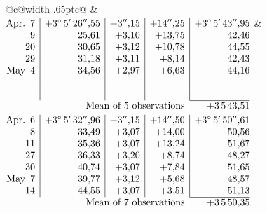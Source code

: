 \noindent\begin{tabular}{@{}c@{\hspace{.4em}\vrule width .65pt\hspace{.4em}}c@{}}
 &
 \\[.18ex]
\(\begin{array}[t]{@{}r|r|r|r|r@{}}
\text{Apr.}\enspace 7 & +3^\circ\,5'\,26''{,}55 & +3''{,}15 & +14''{,}25 & +3^\circ\,5'\,43''{,}95\\
9 & 25{,}61 & +3{,}10 & +13{,}75 & 42{,}46\\
20 & 30{,}65 & +3{,}12 & +10{,}78 & 44{,}55\\
29 & 31{,}18 & +3{,}11 & +8{,}14 & 42{,}43\\
\text{May}\enspace 4 & 34{,}56 & +2{,}97 & +6{,}63 & 44{,}16\\
 & & & & \\
 & & & & \\
\cline{5-5}
\multicolumn{4}{r}{\text{Mean of 5 observations}} & +3\,5\,43{,}51
\end{array}\)
&
\(\begin{array}[t]{@{}r|r|r|r|r@{}}
\text{Apr.}\enspace 6 & +3^\circ\,5'\,32''{,}96 & +3''{,}15 & +14''{,}50 & +3^\circ\,5'\,50''{,}61\\
8 & 33{,}49 & +3{,}07 & +14{,}00 & 50{,}56\\
11 & 35{,}36 & +3{,}07 & +13{,}24 & 51{,}67\\
27 & 36{,}33 & +3{,}20 & +8{,}74 & 48{,}27\\
30 & 40{,}74 & +3{,}07 & +7{,}84 & 51{,}65\\
\text{May}\enspace 7 & 39{,}77 & +3{,}12 & +5{,}68 & 48{,}57\\
14 & 44{,}55 & +3{,}07 & +3{,}51 & 51{,}13\\
\cline{5-5}
\multicolumn{4}{r}{\text{Mean of 7 observations}} & +3\,5\,50{,}35
\end{array}\)
\end{tabular}\par\medskip
